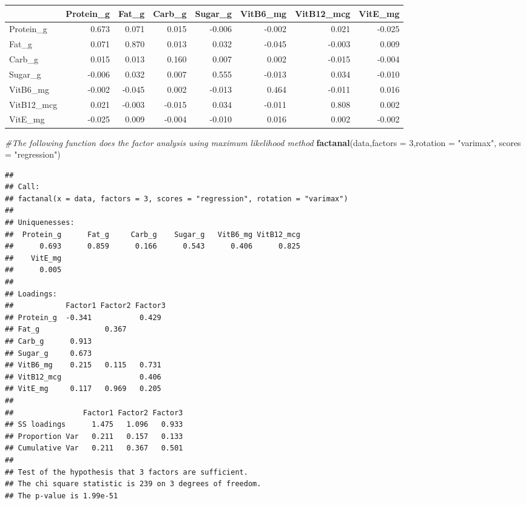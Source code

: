 \documentclass[]{article}
\newenvironment{Shaded}{\begin{snugshade}}{\end{snugshade}}
\newcommand{\KeywordTok}[1]{\textcolor[rgb]{0.13,0.29,0.53}{\textbf{#1}}}
\newcommand{\DataTypeTok}[1]{\textcolor[rgb]{0.13,0.29,0.53}{#1}}
\newcommand{\DecValTok}[1]{\textcolor[rgb]{0.00,0.00,0.81}{#1}}
\newcommand{\StringTok}[1]{\textcolor[rgb]{0.31,0.60,0.02}{#1}}
\newcommand{\CommentTok}[1]{\textcolor[rgb]{0.56,0.35,0.01}{\textit{#1}}}
\newcommand{\NormalTok}[1]{#1}
\begin{document}
\begin{longtable}[]{@{}lrrrrrrr@{}}
\toprule
& Protein\_g & Fat\_g & Carb\_g & Sugar\_g & VitB6\_mg & VitB12\_mcg &
VitE\_mg\tabularnewline
\midrule
\endhead
Protein\_g & 0.673 & 0.071 & 0.015 & -0.006 & -0.002 & 0.021 &
-0.025\tabularnewline
Fat\_g & 0.071 & 0.870 & 0.013 & 0.032 & -0.045 & -0.003 &
0.009\tabularnewline
Carb\_g & 0.015 & 0.013 & 0.160 & 0.007 & 0.002 & -0.015 &
-0.004\tabularnewline
Sugar\_g & -0.006 & 0.032 & 0.007 & 0.555 & -0.013 & 0.034 &
-0.010\tabularnewline
VitB6\_mg & -0.002 & -0.045 & 0.002 & -0.013 & 0.464 & -0.011 &
0.016\tabularnewline
VitB12\_mcg & 0.021 & -0.003 & -0.015 & 0.034 & -0.011 & 0.808 &
0.002\tabularnewline
VitE\_mg & -0.025 & 0.009 & -0.004 & -0.010 & 0.016 & 0.002 &
-0.002\tabularnewline
\bottomrule
\end{longtable}

\begin{Shaded}
\begin{Highlighting}[]
\CommentTok{#The following function does the factor analysis using maximum likelihood method}
\KeywordTok{factanal}\NormalTok{(data,}\DataTypeTok{factors =} \DecValTok{3}\NormalTok{,}\DataTypeTok{rotation =} \StringTok{"varimax"}\NormalTok{, }\DataTypeTok{scores =} \StringTok{"regression"}\NormalTok{)}
\end{Highlighting}
\end{Shaded}

\begin{verbatim}
## 
## Call:
## factanal(x = data, factors = 3, scores = "regression", rotation = "varimax")
## 
## Uniquenesses:
##  Protein_g      Fat_g     Carb_g    Sugar_g   VitB6_mg VitB12_mcg 
##      0.693      0.859      0.166      0.543      0.406      0.825 
##    VitE_mg 
##      0.005 
## 
## Loadings:
##            Factor1 Factor2 Factor3
## Protein_g  -0.341           0.429 
## Fat_g               0.367         
## Carb_g      0.913                 
## Sugar_g     0.673                 
## VitB6_mg    0.215   0.115   0.731 
## VitB12_mcg                  0.406 
## VitE_mg     0.117   0.969   0.205 
## 
##                Factor1 Factor2 Factor3
## SS loadings      1.475   1.096   0.933
## Proportion Var   0.211   0.157   0.133
## Cumulative Var   0.211   0.367   0.501
## 
## Test of the hypothesis that 3 factors are sufficient.
## The chi square statistic is 239 on 3 degrees of freedom.
## The p-value is 1.99e-51
\end{verbatim}
\end{document}
